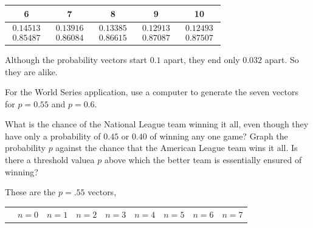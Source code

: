 \begin{exercises}
\begin{answer}
\begin{exparts}
\begin{center}
             \begin{tabular}{|ccccc}
               6  &7  &8  &9 &10 \\ 
               \hline
               $\begin{array}{c}  0.14513 \\ 0.85487  \end{array}$
               &$\begin{array}{c}  0.13916 \\ 0.86084  \end{array}$
               &$\begin{array}{c}  0.13385 \\ 0.86615  \end{array}$
               &$\begin{array}{c}  0.12913 \\ 0.87087  \end{array}$
               &$\begin{array}{c}  0.12493 \\ 0.87507  \end{array}$
             \end{tabular}
           \end{center}
          \partsitem Although the probability vectors start $0.1$ apart,
            they end only $0.032$ apart.
            So they are alike.
       \end{exparts}
     \end{answer}  
  \item 
    For the World Series application, use a computer to generate
    the seven vectors for $p=0.55$ and $p=0.6$.
    \begin{exparts}
      \partsitem What is the chance of the National League team winning it all,
        even though they have only a probability of $0.45$ or $0.40$ of
        winning any one game?
      \partsitem Graph the probability $p$ against the chance that the
        American League team wins it all.
        Is there a threshold value\Dash a $p$ above which the better team
        is essentially ensured of winning?
    \end{exparts}
    \begin{answer}
     These are the $p=.55$ vectors, 
     \begin{center}\small
       \begin{tabular}{@{}rc|ccccccc@{}}
         &$n=0$  &$n=1$  &$n=2$  &$n=3$  &$n=4$  &$n=5$  &$n=6$  &$n=7$  \\ 

\end{tabular}
\end{center}
\end{answer}
\end{exercises}
